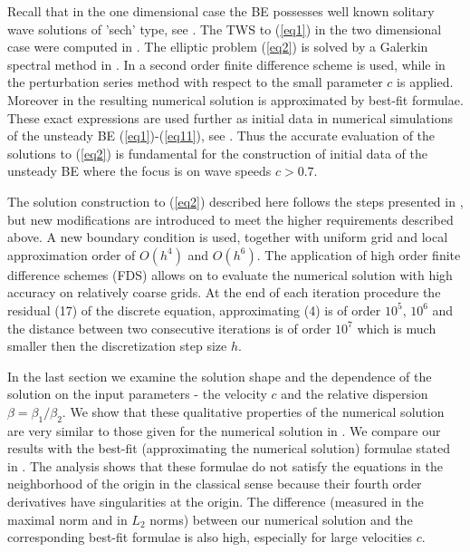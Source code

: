 \documentclass[preprint]{elsarticle}
\newcommand{\rf}[1]{(\ref{#1})}
\begin{document}
Recall that in the one dimensional case the BE possesses well known solitary wave solutions of 'sech' type, see \cite{Ch1996}. 
The  TWS to \rf{eq1} in the two dimensional case  were  computed in \cite{chd-chr, chr-chr-07,chr-chr,Ch2011,Ch2012}. 
The elliptic problem \rf{eq2} is solved by a Galerkin spectral method in \cite{chr-chr-07,chr-chr}.
In \cite{Ch2012} a second order  finite difference scheme is used, while in \cite{Ch2011} 
 the perturbation series method with respect to the small parameter $c$ is applied.  Moreover in  \cite{Ch2011} 
the resulting numerical  solution is approximated by best-fit  formulae.  These exact expressions  are used further as initial data in numerical simulations of the unsteady  BE \rf{eq1}-\rf{eq11}, see  \cite{cher,dani}.
Thus the accurate evaluation of the solutions to \rf{eq2} is fundamental for the construction of initial data of the unsteady BE where the focus is on wave speeds $c > 0.7$. 

The solution construction to \rf{eq2} described here follows the steps presented in \cite{Ch2012},
but new modifications are introduced to meet the higher requirements described above. A new boundary condition is used, together with uniform grid and local approximation order of $O(h^4)$ and $O(h^6)$. The application of high order finite difference schemes (FDS) allows on to evaluate the numerical solution with high accuracy on relatively coarse grids. At the end of each iteration procedure the residual (17) of the discrete equation, approximating (4) is of order $10^5$, $10^6$ and the distance between two consecutive iterations is of order $10^7$ which is much smaller then the discretization step size $h$.
 
In the last section we examine the solution shape and the dependence of the solution on the input  parameters - the velocity $c$ and the relative dispersion $\beta =\beta_1  / \beta_2$. We show that these  qualitative properties of the numerical solution are very similar to those given for the  numerical solution in \cite{Ch2011,Ch2012} . 
We compare our results with the best-fit  (approximating the numerical solution)  formulae stated in \cite{Ch2011}.   
The analysis  shows that  these formulae do not satisfy the equations in the neighborhood of the origin in the classical sense because their fourth order derivatives have singularities at the origin.  The  difference (measured in the maximal norm and in $L_2$ norms)  between our numerical solution and the corresponding best-fit formulae is also high, especially  for large velocities $c$. 
\end{document}
